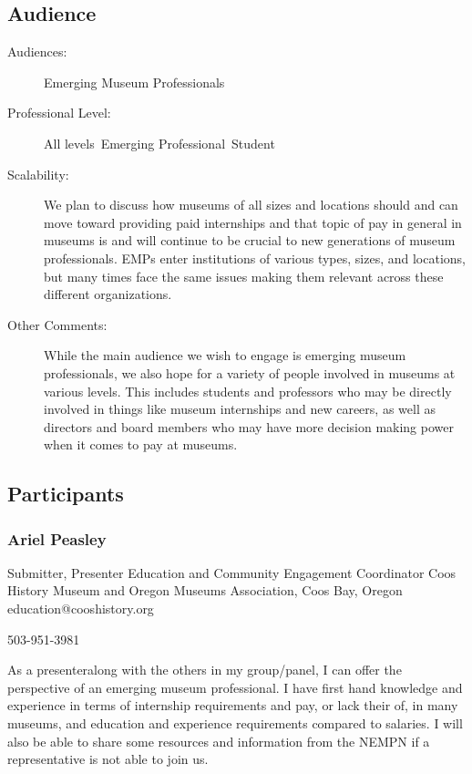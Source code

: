 \documentclass{report}
\begin{document}
              \subsection*{Audience}
                \begin{description}
                  \item [Audiences:]Emerging Museum Professionals~
                  \item[Professional Level:]All levels~Emerging Professional~Student~
                \item[Scalability:] We plan to discuss how museums of all sizes and locations should and can move toward providing paid internships and that topic of pay in general in museums is and will continue to be crucial to new generations of museum professionals. EMPs enter institutions of various types, sizes, and locations, but many times face the same issues making them relevant across these different organizations.

							
              \item[Other Comments:] While the main audience we wish to engage is emerging museum professionals, we also hope for a variety of people involved in museums at various levels. This includes students and professors who may be directly involved in things like museum internships and new careers, as well as directors and board members who may have more decision making power when it comes to pay at museums.
              \end{description}
            \subsection*{Participants}
              \subsubsection*{ Ariel  Peasley }
              Submitter, Presenter\newline
              Education and Community Engagement Coordinator\newline
              Coos History Museum and Oregon Museums Association, Coos Bay, Oregon
              \newline
              education@cooshistory.org\newline
              
              503-951-3981\newline

              As a presenteralong with the others in my group/panel, I can offer the perspective of an emerging museum professional. I have first hand knowledge and experience in terms of internship requirements and pay, or lack their of, in many museums, and education and experience requirements compared to salaries. I will also be able to share some resources and information from the NEMPN if a representative is not able to join us.\newline
\end{document}
